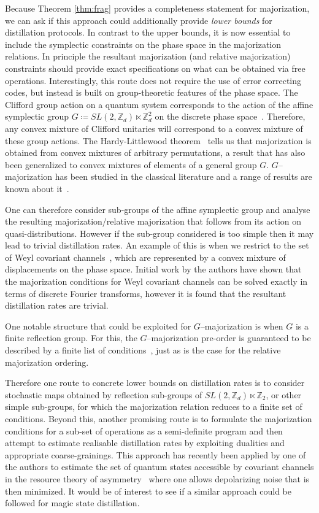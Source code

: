 \documentclass[
onecolumn,
superscriptaddress
]{revtex4-1}
\newcommand{\revhigh}[1]{{\color{red}#1}}
\begin{document}
Because Theorem \ref{thm:frag}  provides a completeness statement for majorization, we can ask if this approach could additionally provide \emph{lower bounds} for distillation protocols. In contrast to the upper bounds, it is now essential to include the symplectic constraints on the phase space in the majorization relations.  \revhigh{In principle the resultant majorization (and relative majorization) constraints should provide exact specifications on what can be obtained via free operations. 
Interestingly, this route does not require the use of error correcting codes, but instead is built on group-theoretic features of the phase space. } The Clifford group action on a quantum system corresponds to the action of the affine symplectic group $G \coloneqq SL(2,\mathbb{Z}_d) \ltimes \mathbb{Z}_d^2$ on the discrete phase space~\cite{Appleby_2005, Bengtsson_2006}. Therefore, any convex mixture of Clifford unitaries will correspond to a convex mixture of these group actions. The Hardy-Littlewood theorem~\cite{hardy_1952} tells us that majorization is obtained from convex mixtures of arbitrary permutations, a result that has also been generalized to convex mixtures of elements of a general group $G$. $G$--majorization has been studied in the classical literature and a range of results are known about it~\cite{giovagnoli_1985, steerneman_1990, giovagnoli_cyclic_1996, eaton_1977}. 
\revhigh{One can therefore consider sub-groups of the affine symplectic group and analyse the resulting majorization/relative majorization that follows from its action on quasi-distributions. However if the sub-group considered is too simple then it may lead to trivial distillation rates. An example of this is when we restrict to the set of Weyl covariant channels~\cite{fukuda2006}, which are represented by a convex mixture of displacements on the phase space. Initial work by the authors have shown that the majorization conditions for Weyl covariant channels can be solved exactly in terms of discrete Fourier transforms, however it is found that the resultant distillation rates are trivial.  

One notable structure that could be exploited for $G$--majorization is when $G$ is a finite reflection group. For this,  the $G$--majorization pre-order is guaranteed to be described by a finite list of conditions~\cite{giovagnoli_1985}, just as is the case for the relative majorization ordering.} Therefore one route to concrete lower bounds on distillation rates is to consider stochastic maps obtained by reflection sub-groups of $SL(2,\mathbb{Z}_d) \ltimes \mathbb{Z}_2$, or other simple sub-groups, for which the majorization relation reduces to a finite set of conditions. \revhigh{Beyond this, another promising route is to formulate the majorization conditions for a sub-set of operations as a semi-definite program and then attempt to estimate realisable distillation rates by exploiting dualities and appropriate coarse-grainings. This approach has recently been applied by one of the authors to estimate the set of quantum states accessible by covariant channels in the resource theory of asymmetry~\cite{alexander2021} where one allows depolarizing noise that is then minimized. 
It would be of interest to see if a similar approach could be followed for magic state distillation.}
 
\end{document}
